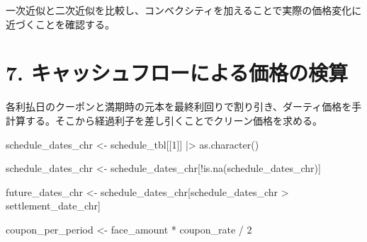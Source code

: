 \documentclass[
  letterpaper,
  DIV=11,
  numbers=noendperiod]{scrreprt}
\newenvironment{Shaded}{\begin{snugshade}}{\end{snugshade}}
\newcommand{\DecValTok}[1]{\textcolor[rgb]{0.68,0.00,0.00}{#1}}
\newcommand{\FunctionTok}[1]{\textcolor[rgb]{0.28,0.35,0.67}{#1}}
\newcommand{\NormalTok}[1]{\textcolor[rgb]{0.00,0.23,0.31}{#1}}
\newcommand{\OtherTok}[1]{\textcolor[rgb]{0.00,0.23,0.31}{#1}}
\newcommand{\SpecialCharTok}[1]{\textcolor[rgb]{0.37,0.37,0.37}{#1}}
\begin{document}
一次近似と二次近似を比較し、コンベクシティを加えることで実際の価格変化に近づくことを確認する。

\section{7.
キャッシュフローによる価格の検算}\label{ux30adux30e3ux30c3ux30b7ux30e5ux30d5ux30edux30fcux306bux3088ux308bux4fa1ux683cux306eux691cux7b97}

各利払日のクーポンと満期時の元本を最終利回りで割り引き、ダーティ価格を手計算する。そこから経過利子を差し引くことでクリーン価格を求める。

\begin{Shaded}
\begin{Highlighting}[]
\NormalTok{schedule\_dates\_chr }\OtherTok{\textless{}{-}}\NormalTok{ schedule\_tbl[[}\DecValTok{1}\NormalTok{]] }\SpecialCharTok{|\textgreater{}}
  \FunctionTok{as.character}\NormalTok{()}

\NormalTok{schedule\_dates\_chr }\OtherTok{\textless{}{-}}\NormalTok{ schedule\_dates\_chr[}\SpecialCharTok{!}\FunctionTok{is.na}\NormalTok{(schedule\_dates\_chr)]}

\NormalTok{future\_dates\_chr }\OtherTok{\textless{}{-}}\NormalTok{ schedule\_dates\_chr[schedule\_dates\_chr }\SpecialCharTok{\textgreater{}}\NormalTok{ settlement\_date\_chr]}

\NormalTok{coupon\_per\_period }\OtherTok{\textless{}{-}}\NormalTok{ face\_amount }\SpecialCharTok{*}\NormalTok{ coupon\_rate }\SpecialCharTok{/} \DecValTok{2}


\end{Highlighting}
\end{Shaded}
\end{document}

